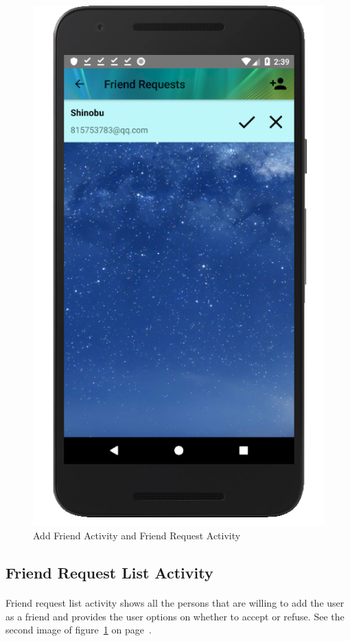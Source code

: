 \documentclass[12pt]{article}
\begin{document}
\begin{figure}
	\includegraphics[scale=0.25]{FriendRequest.png}
	\caption{\label{fig:requestAdd}Add Friend Activity and Friend Request Activity}
\end{figure}

\subsection{Friend Request List Activity}
\paragraph{}
Friend request list activity shows all the persons that are willing to add the user as a friend and provides the user options on whether to accept or refuse. See the second image of figure~\ref{fig:requestAdd} on page~\pageref{fig:requestAdd}.
\end{document}
